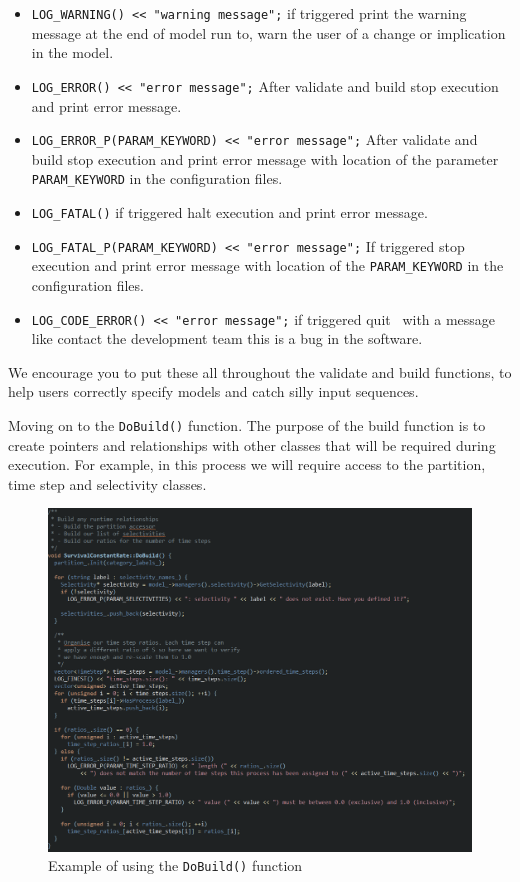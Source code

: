 \begin{itemize}
	\item \texttt{LOG\_WARNING() << "warning message";} if triggered print the warning message at the end of model run to, warn the user of a change or implication in the model.
	\item \texttt{LOG\_ERROR() << "error message";} After validate and build stop execution and print error message.
	\item \texttt{LOG\_ERROR\_P(PARAM\_KEYWORD) << "error message";} After validate and build stop execution and print error message with location of the parameter \texttt{PARAM\_KEYWORD} in the configuration files.
	\item \texttt{LOG\_FATAL()} if triggered halt execution and print error message.
	\item \texttt{LOG\_FATAL\_P(PARAM\_KEYWORD) << "error message";} If triggered stop execution and print error message with location of the \texttt{PARAM\_KEYWORD} in the configuration files.		
	\item \texttt{LOG\_CODE\_ERROR() << "error message";} if triggered quit \CNAME\ with a message like contact the development team this is a bug in the software.	
\end{itemize}

We encourage you to put these all throughout the validate and build functions, to help users correctly specify models and catch silly input sequences.

Moving on to the \texttt{DoBuild()} function. The purpose of the build function is to create pointers and relationships with other classes that will be required during execution. For example, in this process we will require access to the partition, time step and selectivity classes.

\begin{figure}[H]
	\centering
	\includegraphics[scale=0.6]{Figures/Build.png}
	\caption{Example of using the \texttt{DoBuild()} function}\label{fig:build}
\end{figure}

